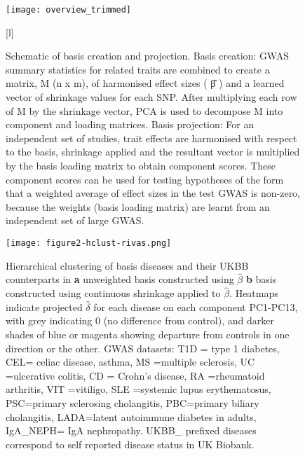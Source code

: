 \documentclass[11pt]{article}
\begin{document}
\setcounter{page}{33}
\begin{figure}
  \centering
  \texttt{[image: overview\_trimmed]}
  \caption{Schematic of basis creation and projection. Basis creation: GWAS summary statistics for
related traits are combined to create a matrix, M (n x m), of harmonised effect sizes ( β̂ ) and a learned
vector of shrinkage values for each SNP. After multiplying each row of M by the shrinkage vector, PCA
is used to decompose M into component and loading matrices. Basis projection: For an independent set of studies, trait effects
are harmonised with respect to the basis, shrinkage applied and the resultant vector is multiplied by the
basis loading matrix to obtain component scores. These component scores can be used for testing hypotheses of the form that a weighted average of effect sizes in the test GWAS is non-zero, because the weights (basis loading matrix) are learnt from an independent set of large GWAS.%
}
[l]
\end{figure}


\begin{figure}
  \centering
  \texttt{[image: figure2-hclust-rivas.png]}
  \caption{Hierarchical clustering of basis diseases and their UKBB counterparts in \textbf{a} unweighted basis constructed using $\hat\beta$  \textbf{b}  basis constructed using continuous shrinkage applied to $\hat\beta$.  Heatmaps indicate projected $\hat\delta$ for each disease on each component PC1-PC13, with grey indicating 0 (no difference from control), and darker shades of blue or magenta showing departure from controls in one direction or the other. GWAS datasets: T1D = type 1 diabetes, CEL= celiac disease, asthma, MS =multiple sclerosis, UC =ulcerative colitis, CD = Crohn's disease, RA =rheumatoid arthritis, VIT =vitiligo, SLE =systemic lupus erythematosus, PSC=primary sclerosing cholangitis, PBC=primary biliary cholangitis, LADA=latent autoimmune diabetes in adults, IgA\_NEPH= IgA nephropathy. UKBB\_ prefixed diseases correspond to self reported disease status in UK Biobank.}
  \label{fig:2}
\end{figure}
\end{document}
